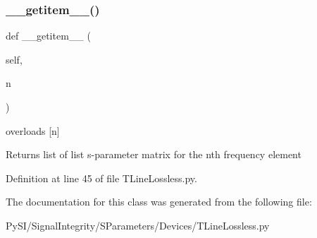 \subsubsection{\texorpdfstring{\+\_\+\+\_\+getitem\+\_\+\+\_\+()}{\_\_getitem\_\_()}}
{\footnotesize\ttfamily def \+\_\+\+\_\+getitem\+\_\+\+\_\+ (\begin{DoxyParamCaption}\item[{}]{self,  }\item[{}]{n }\end{DoxyParamCaption})}



overloads \mbox{[}n\mbox{]} 

\begin{DoxyReturn}{Returns}
list of list s-\/parameter matrix for the nth frequency element 
\end{DoxyReturn}


Definition at line 45 of file T\+Line\+Lossless.\+py.



The documentation for this class was generated from the following file\+:\begin{DoxyCompactItemize}
\item 
Py\+S\+I/\+Signal\+Integrity/\+S\+Parameters/\+Devices/T\+Line\+Lossless.\+py\end{DoxyCompactItemize}
